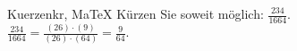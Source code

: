 \begin{MAufgabe}{Kuerzen}{kr, MaTeX}
K\"urzen Sie soweit m\"oglich: $\frac{234}{1664}$.\\ 
\ifLsg\MLoesung
\quad $\frac{234}{1664}=\frac{(26)\cdot(9)}{(26)\cdot(64)}=\frac{9}{64}$.\else\relax\fi
 \end{MAufgabe}